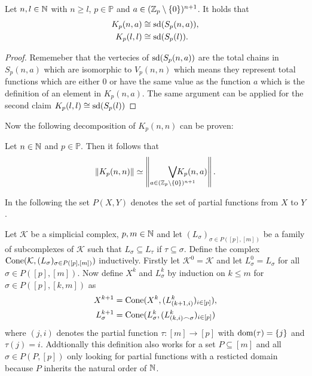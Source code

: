 \begin{rem}\label{rem:kcongs}
  Let $n,l\in\mathbb{N}$ with $n \geq l$, $p\in\mathbb{P}$ and $a\in (\mathbb{Z}_p\setminus\{0\})^{n+1}$. It holds that
  \begin{align*}
    K_p(n,a) &\cong {\rm sd}(S_p(n,a)), \\
    K_p(l,l) &\cong {\rm sd}(S_p(l)).
  \end{align*}
\end{rem}

\begin{proof}
  Rememeber that the vertecies of ${\rm sd}(S_p(n,a))$ are the total chains in $S_p(n,a)$ which are isomorphic to $V_p(n,n)$ which means they represent total functions which are either 0 or have the same value as the function $a$ which is the definition of an element in $K_p(n,a)$. The same argument can be applied for the second claim $K_p(l,l) \cong {\rm sd}(S_p(l))$
\end{proof}

Now the following decomposition of $K_p(n,n)$ can be proven:
\begin{lemma}\label{lem:kpka}
  Let $n\in\mathbb{N}$ and $p\in\mathbb{P}$. Then it follows that
  \begin{equation*}
    \left\lVert K_p(n,n) \right\rVert \simeq \left\lVert \bigvee_{a\in(\Z_p\setminus\{0\})^{n+1}}\hspace*{-24px}K_p(n,a)\right\rVert.
  \end{equation*}
\end{lemma}

In the following the set $P(X, Y)$ denotes the set of partial functions from $X$ to $Y$.

\begin{defin}
  Let $\mathcal{K}$ be a simplicial complex, $p,m \in \mathbb{N}$ and let $(L_\sigma)_{\sigma \in P([p],[m])}$ be a family of subcomplexes of $\mathcal{K}$ such that $L_\sigma \subseteq L_\tau$ if $\tau \subseteq \sigma$. Define the complex ${\rm Cone}(\mathcal{K}, (L_\sigma)_{\sigma\in P([p],[m])})$ inductively. Firstly let $\mathcal{K}^0 = \mathcal{K}$ and let $L_\sigma^0 = L_\sigma$ for all $\sigma \in P([p],[m])$. Now define $X^k$ and $L_\sigma^k$ by induction on $k \leq m$ for $\sigma \in P([p], [k,m])$ as
  \begin{align*}
    X^{k+1} &= {\rm Cone}(X^k, (L^k_{(k+1,i)})_{i\in [p]}), \\
    L^{k+1}_\sigma &= {\rm Cone}(L^k_\sigma, (L^k_{(k,i)\frown \sigma})_{i\in [p]})
  \end{align*}
  where $(j,i)$ denotes the partial function $\tau\colon [m] \to [p]$ with ${\rm dom}(\tau) = \{j\}$ and $\tau(j) = i$.
  Addtionally this definition also works for a set $P \subseteq [m]$ and all $\sigma \in P(P, [p])$ only looking for partial functions with a resticted domain because $P$ inherits the natural order of $\mathbb{N}$.
\end{defin}

